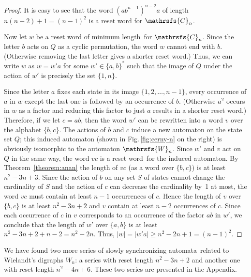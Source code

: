 \documentclass[11pt]{llncs}
\newcommand{\sa}{synchronizing automata}
\newcommand{\sw}{reset word}
\newcommand{\ssw}{reset word of minimum length}
\begin{document}
\begin{proof}
It is easy to see that the word $(ab^{n-1})^{n-2}a$ of length
$n(n-2)+1=(n-1)^2$ is a reset word for $\mathrsfs{C}_n$.

Now let $w$ be a \ssw\ for $\mathrsfs{C}_n$. Since the letter $b$
acts on $Q$ as a cyclic permutation, the word $w$ cannot end with $b$.
(Otherwise removing the last letter gives a shorter \sw.) Thus, we can
write $w$ as $w = w'a$ for some $w'\in\{a,b\}^*$ such that the image
of $Q$ under the action of $w'$ is precisely the set $\{1,n\}$.

Since the letter $a$ fixes each state in its image $\{1,2,\dots,n-1\}$,
every occurrence of $a$ in $w$ except the last one is followed by an
occurrence of $b$. (Otherwise $a^2$ occurs in $w$ as a factor and
reducing this factor to just $a$ results in a shorter \sw.) Therefore,
if we let $c=ab$, then the word $w'$ can be rewritten into a word $v$
over the alphabet $\{b,c\}$. The actions of $b$ and $c$ induce
a new automaton on the state set $Q$; this induced automaton (shown in
Fig.\,\ref{fig:cerny-n} on the right) is obviously isomorphic to the
automaton $\mathrsfs{W}_n$. Since $w'$ and $v$ act on $Q$ in the same way,
the word $vc$ is a \sw\ for the induced automaton. By Theorem~\ref{theorem:anan}
the length of $vc$ (as a word over $\{b,c\}$) is at least $n^2-3n+3$.
Since the action of $b$ on any set $S$ of states cannot change the
cardinality of $S$ and the action of $c$ can decrease the cardinality
by~1 at most, the word $vc$ must contain at least $n-1$ occurrences of
$c$. Hence the length of $v$ over $\{b,c\}$ is at least $n^2-3n+2$ and
$v$ contain at least $n-2$ occurrences of $c$. Since each occurrence of
$c$ in $v$ corresponds to an occurrence of the factor $ab$ in $w'$, we
conclude that the length of $w'$ over $\{a,b\}$ is at least $n^2-3n+2+n-2=n^2-2n$.
Thus, $|w|=|w'a|\ge n^2-2n+1=(n-1)^2$.
\end{proof}

We have found two more series of slowly \sa\ related to Wielandt's digraphs
$W_n$: a series with reset length $n^2-3n+2$ and another one with reset length
$n^2-4n+6$. These two series are presented in the Appendix.
\end{document}
